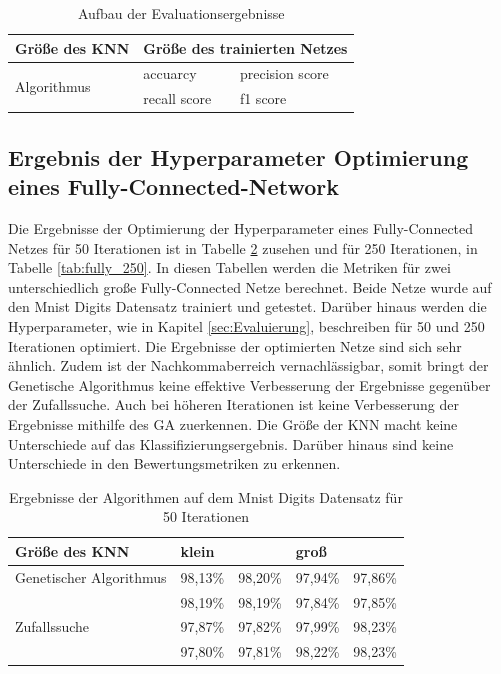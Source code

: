 \begin{table} [h]
\centering
\caption{Aufbau der Evaluationsergebnisse}
\label{tab:example_eval}
\begin{tabular}{lll}\toprule
Größe des KNN                & \multicolumn{2}{l}{Größe des trainierten Netzes}       \\\midrule
\multirow{2}{*}{Algorithmus} & accuarcy     & precision score  \\
                             & recall score & f1 score        \\\bottomrule
\end{tabular}
\end{table}


\subsection{Ergebnis der Hyperparameter Optimierung eines Fully-Connected-Network}
Die Ergebnisse der Optimierung der Hyperparameter eines Fully-Connected Netzes für 50 Iterationen ist in Tabelle \ref{tab:fully_50} zusehen und für 250 Iterationen, in Tabelle \ref{tab:fully_250}. In diesen Tabellen werden die Metriken für zwei unterschiedlich große Fully-Connected Netze berechnet. Beide Netze wurde auf den Mnist Digits Datensatz trainiert und getestet. Darüber hinaus werden die Hyperparameter, wie in Kapitel \ref{sec:Evaluierung}, beschreiben für 50 und 250 Iterationen optimiert. Die Ergebnisse der optimierten Netze sind sich sehr ähnlich. Zudem ist der Nachkommaberreich vernachlässigbar, somit bringt der Genetische Algorithmus keine effektive Verbesserung der Ergebnisse gegenüber der Zufallssuche. Auch bei höheren Iterationen ist keine Verbesserung der Ergebnisse mithilfe des GA zuerkennen. Die Größe der KNN macht keine Unterschiede auf das Klassifizierungsergebnis. Darüber hinaus sind keine Unterschiede in den Bewertungsmetriken zu erkennen. 


\begin{table}[h]
\centering
\caption{Ergebnisse der Algorithmen auf dem Mnist Digits Datensatz für 50 Iterationen}
\label{tab:fully_50}
\begin{tabular}{lllll} 
\toprule
Größe des KNN & \multicolumn{2}{l}{klein} & \multicolumn{2}{l}{groß}  \\ 
\midrule
Genetischer Algorithmus            & 98,13\% & 98,20\%         & 97,94\% & 97,86\%         \\
              & 98,19\% & 98,19\%         & 97,84\% & 97,85\%         \\
Zufallssuche            & 97,87\% & 97,82\%         & 97,99\% & 98,23\%         \\
              & 97,80\% & 97,81\%         & 98,22\% & 98,23\%         \\
\bottomrule
\end{tabular}
\end{table}

